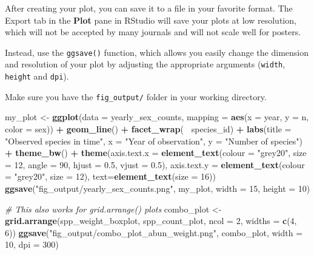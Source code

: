 \documentclass[]{book}
\newenvironment{Shaded}{\begin{snugshade}}{\end{snugshade}}
\newcommand{\KeywordTok}[1]{\textcolor[rgb]{0.13,0.29,0.53}{\textbf{#1}}}
\newcommand{\DataTypeTok}[1]{\textcolor[rgb]{0.13,0.29,0.53}{#1}}
\newcommand{\DecValTok}[1]{\textcolor[rgb]{0.00,0.00,0.81}{#1}}
\newcommand{\FloatTok}[1]{\textcolor[rgb]{0.00,0.00,0.81}{#1}}
\newcommand{\StringTok}[1]{\textcolor[rgb]{0.31,0.60,0.02}{#1}}
\newcommand{\CommentTok}[1]{\textcolor[rgb]{0.56,0.35,0.01}{\textit{#1}}}
\newcommand{\OperatorTok}[1]{\textcolor[rgb]{0.81,0.36,0.00}{\textbf{#1}}}
\newcommand{\NormalTok}[1]{#1}
\begin{document}
After creating your plot, you can save it to a file in your favorite
format. The Export tab in the \textbf{Plot} pane in RStudio will save
your plots at low resolution, which will not be accepted by many
journals and will not scale well for posters.

Instead, use the \texttt{ggsave()} function, which allows you easily
change the dimension and resolution of your plot by adjusting the
appropriate arguments (\texttt{width}, \texttt{height} and
\texttt{dpi}).

Make sure you have the \texttt{fig\_output/} folder in your working
directory.

\begin{Shaded}
\begin{Highlighting}[]
\NormalTok{my_plot <-}\StringTok{ }\KeywordTok{ggplot}\NormalTok{(}\DataTypeTok{data =}\NormalTok{ yearly_sex_counts, }
                  \DataTypeTok{mapping =} \KeywordTok{aes}\NormalTok{(}\DataTypeTok{x =}\NormalTok{ year, }\DataTypeTok{y =}\NormalTok{ n, }\DataTypeTok{color =}\NormalTok{ sex)) }\OperatorTok{+}
\StringTok{    }\KeywordTok{geom_line}\NormalTok{() }\OperatorTok{+}
\StringTok{    }\KeywordTok{facet_wrap}\NormalTok{(}\OperatorTok{~}\StringTok{ }\NormalTok{species_id) }\OperatorTok{+}
\StringTok{    }\KeywordTok{labs}\NormalTok{(}\DataTypeTok{title =} \StringTok{"Observed species in time"}\NormalTok{,}
        \DataTypeTok{x =} \StringTok{"Year of observation"}\NormalTok{,}
        \DataTypeTok{y =} \StringTok{"Number of species"}\NormalTok{) }\OperatorTok{+}
\StringTok{    }\KeywordTok{theme_bw}\NormalTok{() }\OperatorTok{+}
\StringTok{    }\KeywordTok{theme}\NormalTok{(}\DataTypeTok{axis.text.x =} \KeywordTok{element_text}\NormalTok{(}\DataTypeTok{colour =} \StringTok{"grey20"}\NormalTok{, }\DataTypeTok{size =} \DecValTok{12}\NormalTok{, }\DataTypeTok{angle =} \DecValTok{90}\NormalTok{, }\DataTypeTok{hjust =} \FloatTok{0.5}\NormalTok{, }\DataTypeTok{vjust =} \FloatTok{0.5}\NormalTok{),}
                        \DataTypeTok{axis.text.y =} \KeywordTok{element_text}\NormalTok{(}\DataTypeTok{colour =} \StringTok{"grey20"}\NormalTok{, }\DataTypeTok{size =} \DecValTok{12}\NormalTok{),}
          \DataTypeTok{text=}\KeywordTok{element_text}\NormalTok{(}\DataTypeTok{size =} \DecValTok{16}\NormalTok{))}
\KeywordTok{ggsave}\NormalTok{(}\StringTok{"fig_output/yearly_sex_counts.png"}\NormalTok{, my_plot, }\DataTypeTok{width =} \DecValTok{15}\NormalTok{, }\DataTypeTok{height =} \DecValTok{10}\NormalTok{)}

\CommentTok{# This also works for grid.arrange() plots}
\NormalTok{combo_plot <-}\StringTok{ }\KeywordTok{grid.arrange}\NormalTok{(spp_weight_boxplot, spp_count_plot, }\DataTypeTok{ncol =} \DecValTok{2}\NormalTok{, }\DataTypeTok{widths =} \KeywordTok{c}\NormalTok{(}\DecValTok{4}\NormalTok{, }\DecValTok{6}\NormalTok{))}
\KeywordTok{ggsave}\NormalTok{(}\StringTok{"fig_output/combo_plot_abun_weight.png"}\NormalTok{, combo_plot, }\DataTypeTok{width =} \DecValTok{10}\NormalTok{, }\DataTypeTok{dpi =} \DecValTok{300}\NormalTok{)}
\end{Highlighting}
\end{Shaded}
\end{document}
